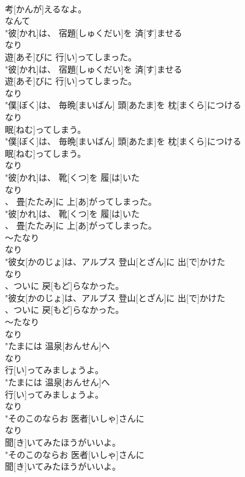 \documentclass[8pt]{extreport}
\begin{document}
\begin{CJK}{UTF8}{min}
\\	考[かんが]えるなよ。
\\	なんて
\\	"彼[かれ]は、 宿題[しゅくだい]を 済[す]ませる
\\	なり
\\	遊[あそ]びに 行[い]ってしまった。
\\	"彼[かれ]は、 宿題[しゅくだい]を 済[す]ませる
\\	遊[あそ]びに 行[い]ってしまった。
\\	なり
\\	"僕[ぼく]は、 毎晩[まいばん] 頭[あたま]を 枕[まくら]につける
\\	なり
\\	眠[ねむ]ってしまう。
\\	"僕[ぼく]は、 毎晩[まいばん] 頭[あたま]を 枕[まくら]につける
\\	眠[ねむ]ってしまう。
\\	なり
\\	"彼[かれ]は、 靴[くつ]を 履[は]いた
\\	なり
\\	、 畳[たたみ]に 上[あ]がってしまった。
\\	"彼[かれ]は、 靴[くつ]を 履[は]いた
\\	、 畳[たたみ]に 上[あ]がってしまった。
\\	～たなり 
\\	なり
\\	"彼女[かのじょ]は、アルプス 登山[とざん]に 出[で]かけた
\\	なり
\\	、ついに 戻[もど]らなかった。
\\	"彼女[かのじょ]は、アルプス 登山[とざん]に 出[で]かけた
\\	、ついに 戻[もど]らなかった。
\\	～たなり 
\\	なり
\\	"たまには 温泉[おんせん]へ
\\	なり
\\	行[い]ってみましょうよ。
\\	"たまには 温泉[おんせん]へ
\\	行[い]ってみましょうよ。
\\	なり
\\	"そのこのならお 医者[いしゃ]さんに
\\	なり
\\	聞[き]いてみたほうがいいよ。
\\	"そのこのならお 医者[いしゃ]さんに
\\	聞[き]いてみたほうがいいよ。

\end{CJK}
\end{document}
